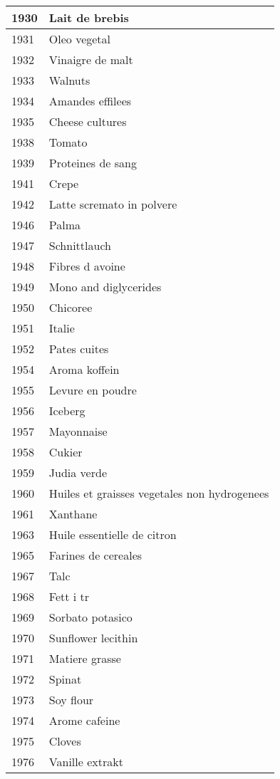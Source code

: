\begin{longtable}{|l|l|}
1930 & Lait de brebis \\ \hline 
1931 & Oleo vegetal \\ \hline 
1932 & Vinaigre de malt \\ \hline 
1933 & Walnuts \\ \hline 
1934 & Amandes effilees \\ \hline 
1935 & Cheese cultures \\ \hline 
1938 & Tomato \\ \hline 
1939 & Proteines de sang \\ \hline 
1941 & Crepe \\ \hline 
1942 & Latte scremato in polvere \\ \hline 
1946 & Palma \\ \hline 
1947 & Schnittlauch \\ \hline 
1948 & Fibres d avoine \\ \hline 
1949 & Mono and diglycerides \\ \hline 
1950 & Chicoree \\ \hline 
1951 & Italie \\ \hline 
1952 & Pates cuites \\ \hline 
1954 & Aroma koffein \\ \hline 
1955 & Levure en poudre \\ \hline 
1956 & Iceberg \\ \hline 
1957 & Mayonnaise \\ \hline 
1958 & Cukier \\ \hline 
1959 & Judia verde \\ \hline 
1960 & Huiles et graisses vegetales non hydrogenees \\ \hline 
1961 & Xanthane \\ \hline 
1963 & Huile essentielle de citron \\ \hline 
1965 & Farines de cereales \\ \hline 
1967 & Talc \\ \hline 
1968 & Fett i tr \\ \hline 
1969 & Sorbato potasico \\ \hline 
1970 & Sunflower lecithin \\ \hline 
1971 & Matiere grasse \\ \hline 
1972 & Spinat \\ \hline 
1973 & Soy flour \\ \hline 
1974 & Arome cafeine \\ \hline 
1975 & Cloves \\ \hline 
1976 & Vanille extrakt \\ \hline 

\end{longtable}
